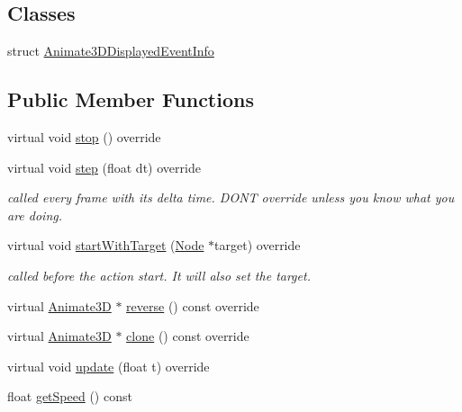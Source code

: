 \subsection*{Classes}
\begin{DoxyCompactItemize}
\item 
struct \hyperlink{structAnimate3D_1_1Animate3DDisplayedEventInfo}{Animate3\+D\+Displayed\+Event\+Info}
\end{DoxyCompactItemize}
\subsection*{Public Member Functions}
\begin{DoxyCompactItemize}
\item 
virtual void \hyperlink{classAnimate3D_a9d27a950ce7942a73a392936951fc263}{stop} () override
\item 
\mbox{\label{classAnimate3D_a0bd0e3f67af5be334ef07255a711c476}} 
virtual void \hyperlink{classAnimate3D_a0bd0e3f67af5be334ef07255a711c476}{step} (float dt) override
\begin{DoxyCompactList}\small\item\em called every frame with it\textquotesingle{}s delta time. D\+ON\textquotesingle{}T override unless you know what you are doing. \end{DoxyCompactList}\item 
\mbox{\label{classAnimate3D_a0c04fb9d432a3fd7811235c492a4969f}} 
virtual void \hyperlink{classAnimate3D_a0c04fb9d432a3fd7811235c492a4969f}{start\+With\+Target} (\hyperlink{classNode}{Node} $\ast$target) override
\begin{DoxyCompactList}\small\item\em called before the action start. It will also set the target. \end{DoxyCompactList}\item 
virtual \hyperlink{classAnimate3D}{Animate3D} $\ast$ \hyperlink{classAnimate3D_aa8acc0668132f57fee370bfdbea308cb}{reverse} () const override
\item 
virtual \hyperlink{classAnimate3D}{Animate3D} $\ast$ \hyperlink{classAnimate3D_a13868382e90e2760717cf8f91f697bc0}{clone} () const override
\item 
virtual void \hyperlink{classAnimate3D_a03bc0bc8212147a742f059fc93361910}{update} (float t) override
\item 
float \hyperlink{classAnimate3D_a22cd253f8b3caf2d96e68c5ff7f833b4}{get\+Speed} () const

\end{DoxyCompactItemize}
